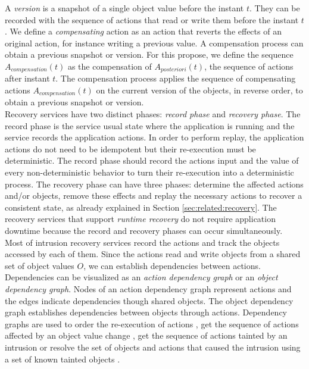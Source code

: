A \textit{version} is a snapshot of a single object value before the instant $t$. They can be recorded with the sequence of actions that read or write them before the instant $t$. We define a \textit{compensating} action as an action that reverts the effects of an original action, for instance writing a previous value. A compensation process can obtain a previous snapshot or version. For this propose, we define the sequence $A_{compensation}(t)$ as the compensation of $A_{posteriori}(t)$, the sequence of actions after instant $t$. The compensation process applies the sequence of compensating actions $A_{compensation}(t)$ on the current version of the objects, in reverse order, to obtain a previous snapshot or version.\\

Recovery services have two distinct phases: \textit{record phase} and \textit{recovery phase}. The record phase is the service usual state where the application is running and the service records the application actions. In order to perform replay, the application actions do not need to be idempotent but their re-execution must be deterministic. The record phase should record the actions input and the value of every non-deterministic behavior to turn their re-execution into a deterministic process. The recovery phase can have three phases: determine the affected actions and/or objects, remove these effects and replay the necessary actions to recover a consistent state, as already explained in Section \ref{sec:related:recovery}. The recovery services that support \textit{runtime recovery} do not require application downtime because the record and recovery phases can occur simultaneously.\\


Most of intrusion recovery services record the actions and track the objects accessed by each of them. Since the actions read and write objects from a shared set of object values $O$, we can establish dependencies between actions. Dependencies can be visualized as an \textit{action dependency graph} or an \textit{object dependency graph}. Nodes of an action dependency graph represent actions and the edges indicate dependencies though shared objects. The object dependency graph establishes dependencies between objects through actions. Dependency graphs are used to order the re-execution of actions \cite{undoForOperators}, get the sequence of actions affected by an object value change \cite{warp}, get the sequence of actions tainted by an intrusion \cite{goel} or resolve the set of objects and actions that caused the intrusion using a set of known tainted objects \cite{backtracker}. 

